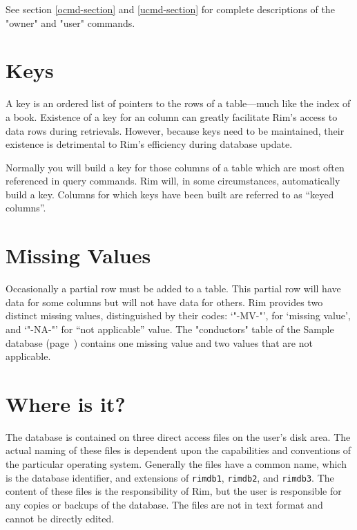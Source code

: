 See section \ref{ocmd-section} and \ref{ucmd-section} for
complete descriptions of the "owner" and "user" commands.
 
\section{Keys}
A key is an ordered list of pointers to the rows of
a table---much like the index of a book.
Existence of a key for an column can greatly
facilitate Rim's access to data rows during retrievals.
However, because keys need to be maintained, their
existence is detrimental to Rim's efficiency during database update.
 
Normally you will build a key for those columns
of a table which are most often referenced in query commands.
Rim will, in some circumstances, automatically build a key.
Columns for which keys have been built are referred to as
``keyed columns''.
 
 
 
\section{Missing Values}
Occasionally a partial row must be added to a table.
This partial row will have data for some columns but
will not have data for others.  Rim provides two distinct
missing values, distinguished by their codes:
`"-MV-"', for `missing value',
and `"-NA-"' for ``not applicable'' value.
The "conductors" table of the Sample database (page~\pageref{Sample})
contains one missing value and two values that are not applicable.
 
\section{Where is it?}
The database is contained on three direct access files
on the user's disk area.  The actual naming of these files
is dependent upon the capabilities and conventions of
the particular operating system.
Generally the
files have a common name, which is the database identifier,
and extensions of {\tt rimdb1}, {\tt rimdb2}, and
{\tt rimdb3}.
The content of these files is the responsibility of Rim,
but the user is responsible for any copies or backups
of the database.
The files are not in text format and cannot be directly
edited.
 
 
 
 
 
